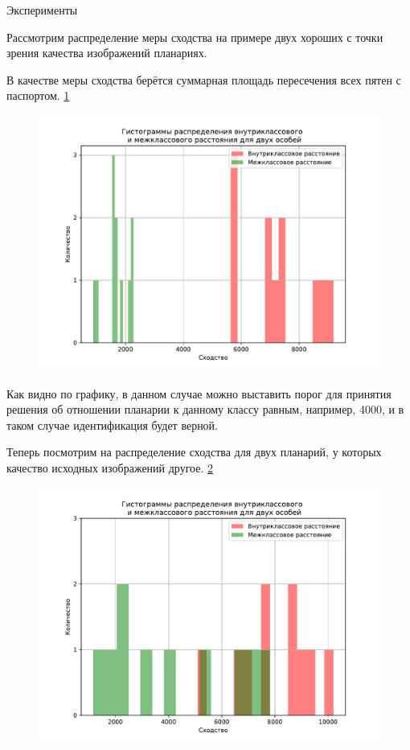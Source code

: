 \documentclass{article}
\begin{document}
\begin{section}{Эксперименты}

Рассмотрим распределение меры сходства на примере двух хороших с точки зрения качества изображений планариях.

В качестве меры сходства берётся суммарная площадь пересечения всех пятен с паспортом. \ref{ref6}

\begin{figure}[H]
\centering
\includegraphics[scale=0.7]{hist-1.pdf}
\label{ref6}
\end{figure}

Как видно по графику, в данном случае можно выставить порог для принятия решения об отношении планарии к данному классу равным, например, 4000, и в таком случае идентификация будет верной.

Теперь посмотрим на распределение сходства для двух планарий, у которых качество исходных изображений другое. \ref{fig7}

\begin{figure}[H!]
\centering
\includegraphics[scale=0.7]{hist_bad.pdf}
\label{fig7}
\end{figure}


\end{section}
\end{document}
